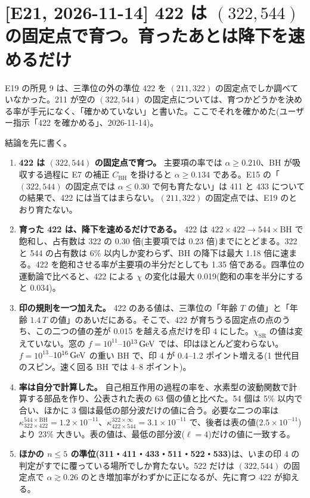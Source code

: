 \section{[E21, 2026-11-14] 422 は $(322,544)$ の固定点で育つ。育ったあとは降下を速めるだけ}\label{sec:e21}

E19 の所見 9 は、三準位の外の準位 422 を $(211,322)$ の固定点でしか調べていなかった。211 が空の $(322,544)$ の固定点については、育つかどうかを決める率が手元になく、「確かめていない」と書いた。ここでそれを確かめた(ユーザー指示「422 を確かめる」、2026-11-14)。

結論を先に書く。
\begin{enumerate}
\item \textbf{422 は $(322,544)$ の固定点で育つ。} 主要項の率では $\alpha\ge0.210$、BH が吸収する過程に E7 の補正 $C_\mathrm{BH}$ を掛けると $\alpha\ge0.134$ である。E15 の「$(322,544)$ の固定点では $\alpha\le0.30$ で何も育たない」は 411 と 433 についての結果で、422 には当てはまらない。$(211,322)$ の固定点では、E19 のとおり育たない。
\item \textbf{育った 422 は、降下を速めるだけである。} 422 は $422\times422\to544\times\mathrm{BH}$ で飽和し、占有数は 322 の 0.30 倍(主要項では 0.23 倍)までにとどまる。322 と 544 の占有数は 6\% 以内しか変わらず、BH の降下は最大 1.18 倍に速まる。422 を飽和させる率が主要項の半分だとしても 1.35 倍である。四準位の運動論で比べると、422 による $\chi$ の変化は最大 0.019(飽和の率を半分にすると 0.034)。
\item \textbf{印の規則を一つ加えた。} 422 のある値は、三準位の「年齢 $T$ の値」と「年齢 $1.4\,T$ の値」のあいだにある。そこで、422 が育ちうる固定点の点のうち、この二つの値の差が 0.015 を越える点だけを印 4 にした。$\chi_\mathrm{SR}$ の値は変えていない。窓の $f=10^{11}$--$10^{13}\,\mathrm{GeV}$ では、印はほとんど変わらない。$f=10^{13}$--$10^{16}\,\mathrm{GeV}$ の重い BH で、印 4 が 0.4--1.2 ポイント増える(1 世代目のスピン。速く回る BH では 4--8 ポイント)。
\item \textbf{率は自分で計算した。} 自己相互作用の過程の率を、水素型の波動関数で計算する部品を作り、公表された表の 63 個の値と比べた。54 個は 5\% 以内で合い、ほかに 3 個は最低の部分波だけの値に合う。必要な二つの率は $\kappa^{544\times\mathrm{BH}}_{322\times422}=1.2\times10^{-11}$、$\kappa^{322\times\infty}_{422\times544}=3.1\times10^{-11}$ で、後者は表の値($2.5\times10^{-11}$)より 23\% 大きい。表の値は、最低の部分波($\ell=4$)だけの値に一致する。
\item \textbf{ほかの $n\le5$ の準位(311・411・433・511・522・533)}は、いまの印 4 の判定がすでに覆っている場所でしか育たない。522 だけは $(322,544)$ の固定点で $\alpha\gtrsim0.26$ のとき増加率がわずかに正になるが、先に育つ 422 が抑える。
\end{enumerate}

